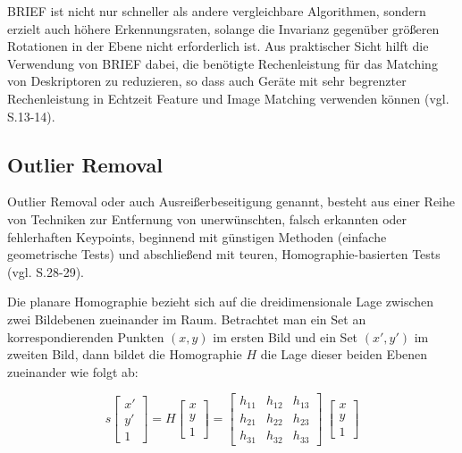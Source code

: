 BRIEF ist nicht nur schneller als andere vergleichbare Algorithmen, sondern erzielt auch höhere Erkennungsraten, solange die Invarianz gegenüber größeren Rotationen in der Ebene nicht erforderlich ist. Aus praktischer Sicht hilft die Verwendung von BRIEF dabei, die benötigte Rechenleistung für das Matching von Deskriptoren zu reduzieren, so dass auch Geräte mit sehr begrenzter Rechenleistung in Echtzeit Feature und Image Matching verwenden können (vgl. \cite{brief} S.13-14).


\subsection{Outlier Removal}

\glqq Outlier Removal\grqq{} oder auch \glqq Ausreißerbeseitigung\grqq{} genannt, besteht aus einer Reihe von Techniken zur Entfernung von unerwünschten, falsch erkannten oder fehlerhaften Keypoints, beginnend mit günstigen Methoden (einfache geometrische Tests) und abschließend mit teuren, Homographie-basierten Tests (vgl. \cite{natural_feature} S.28-29).

Die planare Homographie bezieht sich auf die dreidimensionale Lage zwischen zwei Bildebenen zueinander im Raum. Betrachtet man ein Set an korrespondierenden Punkten $(x,y)$ im ersten Bild und ein Set $(x',y')$ im zweiten Bild, dann bildet die Homographie $H$ die Lage dieser beiden Ebenen zueinander wie folgt ab:

\begin{equation}
  s  
  		\begin{bmatrix}
		x'\\
		y'\\
		1
     	\end{bmatrix}
     = H
     	\begin{bmatrix}
		x\\
		y\\
		1
     	\end{bmatrix}
      = 
     	\begin{bmatrix}
		h_{11} & h_{12} & h_{13}\\
		h_{21} & h_{22} & h_{23}\\
		h_{31} & h_{32} & h_{33}
     	\end{bmatrix}
      \
     	\begin{bmatrix}
		x\\
		y\\
		1
     	\end{bmatrix}
\end{equation}

